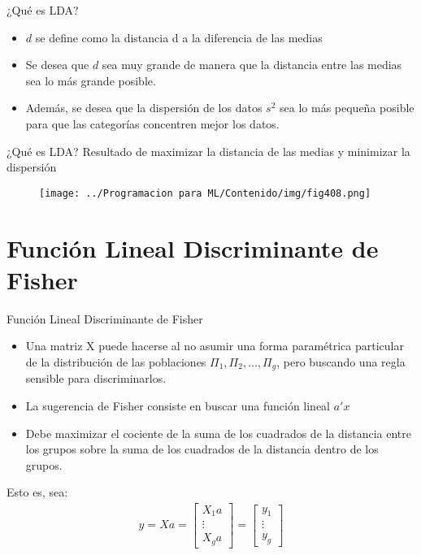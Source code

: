 \documentclass[11pt,aspectratio=169]{beamer}
\begin{document}
\begin{frame}{¿Qué es LDA?}
\begin{itemize}
	\item $d$ se define como la distancia d a la diferencia de las medias\pause
	\item Se desea que $d$ sea muy grande de manera que la distancia entre las medias sea lo más grande posible.\pause 
	\item Además, se desea que la dispersión de los datos $s^2$ sea lo más pequeña posible para que las categorías concentren mejor los datos.
\end{itemize}
\end{frame}

\begin{frame}{¿Qué es LDA?}
Resultado de maximizar la distancia de las medias y minimizar la dispersión
\begin{figure}[H]
	\centering
	\texttt{[image: ../Programacion para ML/Contenido/img/fig408.png]}
\end{figure}
\end{frame}

\section{Función Lineal Discriminante de Fisher}

\begin{frame}{Función Lineal Discriminante de Fisher}
\begin{itemize}
	\item Una matriz X puede hacerse al no asumir una forma paramétrica particular de la distribución de las poblaciones 
		$\Pi_1, \Pi_2, \dots, \Pi_g$, pero buscando una regla sensible para discriminarlos.\pause
	\item La sugerencia de Fisher consiste en buscar una función lineal $a'x$ \pause
	\item Debe maximizar el cociente de la suma de los cuadrados de la distancia entre los grupos sobre la suma de los cuadrados 
		de la distancia dentro de los grupos. \pause
\end{itemize}
Esto es, sea:
\begin{align*}
	y = Xa =\left[ \begin{array}{c}
				X_1a\\
				\vdots\\
				X_ga
			\end{array}\right]
		   = \left[ \begin{array}{c}
				y_1\\
				\vdots\\
				y_g
			\end{array}\right]
\end{align*}
\end{frame}
\end{document}
